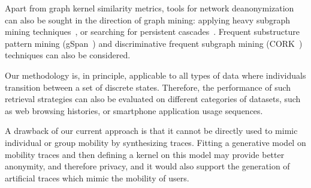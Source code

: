 Apart from graph kernel similarity metrics, tools for network deanonymization can also be sought in the direction of graph mining: applying heavy subgraph mining techniques~\citep{Bogdanov2011}, or searching for persistent cascades~\citep{Morse16}.
Frequent substructure pattern mining (gSpan~\citep{Yan2002}) and discriminative frequent subgraph mining (CORK~\citep{Thoma2010}) techniques can also be considered.

Our methodology is, in principle, applicable to all types of data where individuals transition between a set of discrete states.
Therefore, the performance of such retrieval strategies can also be evaluated on different categories of datasets, such as web browsing histories, or smartphone application usage sequences.

A drawback of our current approach is that it cannot be directly used to mimic individual or group mobility by synthesizing traces.
Fitting a generative model on mobility traces and then defining a kernel on this model may provide better anonymity, and therefore privacy, and it would also support the generation of artificial traces which mimic the mobility of users.
